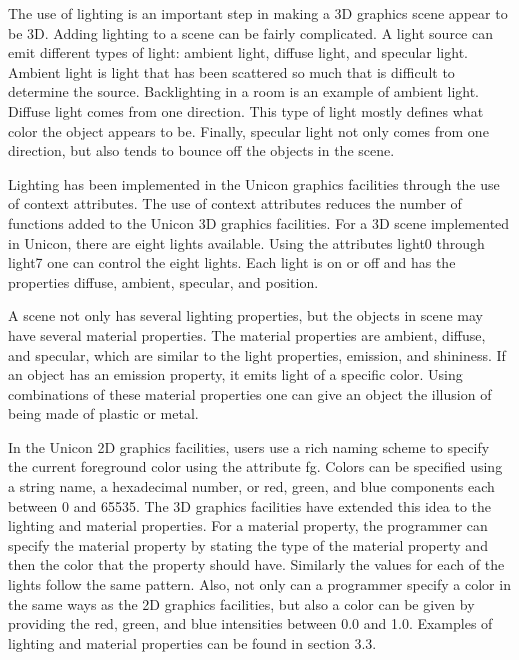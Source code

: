 \documentclass[letterpaper]{article}
\begin{document}
The use of lighting is an important step in making a 3D graphics scene
appear to be 3D. Adding lighting to a scene can be fairly
complicated. A light source can emit different types of light: ambient
light, diffuse light, and specular light. Ambient light is light
that has been scattered so much that is difficult to determine the
source. Backlighting in a room is an example of ambient light. Diffuse
light comes from one direction. This type of light mostly defines what
color the object appears to be. Finally, specular light not only comes
from one direction, but also tends to bounce off the objects in the
scene.

Lighting has been implemented in the Unicon graphics facilities
through the use of context attributes. The use of context attributes
reduces the number of functions added to the Unicon 3D graphics
facilities. For a 3D scene implemented in Unicon, there are eight
lights available. Using the attributes \textsf{light0} through
\textsf{light7} one can control the eight lights. Each light is
\textsf{on} or \textsf{off} and has the properties \textsf{diffuse},
\textsf{ambient}, \textsf{specular}, and \textsf{position}.

A scene not only has several lighting properties, but the objects in
scene may have several material properties. The material properties
are ambient, diffuse, and specular, which are similar to the light
properties, emission, and shininess. If an object has an emission
property, it emits light of a specific color. Using combinations of
these material properties one can give an object the illusion of being
made of plastic or metal.

In the Unicon 2D graphics facilities, users use a rich naming scheme
to specify the current foreground color using the attribute
\textsf{fg}. Colors can be specified using a string name, a
hexadecimal number, or red, green, and blue components each between
\textsf{0} and \textsf{65535}. The 3D graphics facilities have
extended this idea to the lighting and material properties. For a
material property, the programmer can specify the material property by
stating the type of the material property and then the color that the
property should have. Similarly the values for each of the lights
follow the same pattern. Also, not only can a programmer specify a
color in the same ways as the 2D graphics facilities, but also a color
can be given by providing the red, green, and blue intensities between
\textsf{0.0} and \textsf{1.0}. Examples of lighting and material
properties can be found in section 3.3.
\end{document}
